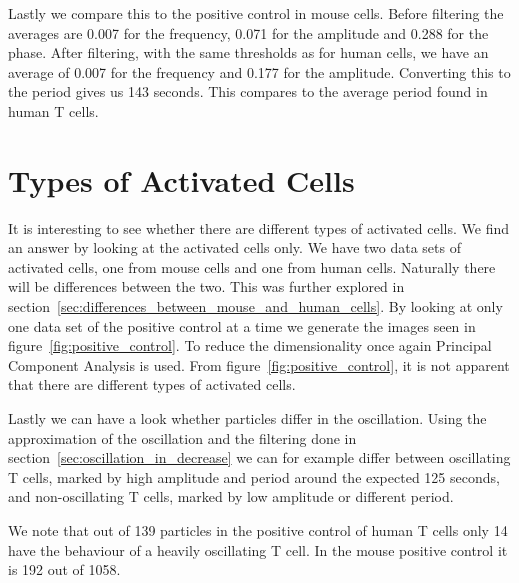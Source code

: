 \newpage
Lastly we compare this to the positive control in mouse cells. Before filtering the averages are 0.007 for the frequency, 0.071 for the amplitude and 0.288 for the phase. After filtering, with the same thresholds as for human cells, we have an average of 0.007 for the frequency and 0.177 for the amplitude. Converting this to the period gives us 143 seconds. This compares to the average period found in human T cells.

\section{Types of Activated Cells}

It is interesting to see whether there are different types of activated cells. We find an answer by looking at the activated cells only. We have two data sets of activated cells, one from mouse cells and one from human cells. Naturally there will be differences between the two. This was further explored in section~\ref{sec:differences_between_mouse_and_human_cells}. By looking at only one data set of the positive control at a time we generate the images seen in figure~\ref{fig:positive_control}. To reduce the dimensionality once again Principal Component Analysis is used. From figure~\ref{fig:positive_control}, it is not apparent that there are different types of activated cells.

Lastly we can have a look whether particles differ in the oscillation. Using the approximation of the oscillation and the filtering done in section~\ref{sec:oscillation_in_decrease} we can for example differ between oscillating T cells, marked by high amplitude and period around the expected 125 seconds, and non-oscillating T cells, marked by low amplitude or different period.

We note that out of 139 particles in the positive control of human T cells only 14 have the behaviour of a heavily oscillating T cell. In the mouse positive control it is 192 out of 1058.

